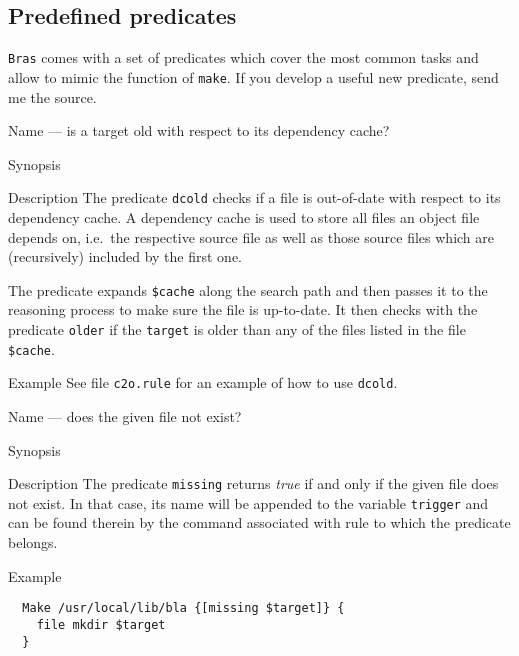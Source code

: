 \documentclass[11pt]{scrartcl}
\newcommand{\Bras}{\texttt{Bras}}
\newcommand{\make}{\texttt{make}}
\begin{document}
\subsection{Predefined predicates}
\label{sec:predicates}

\Bras{} comes with a set of predicates which cover the most common
tasks and allow to mimic the function of \make{}. If you develop a
useful new predicate, send me the source.

\begin{Describe}
\item[Name]  --- is a target old with respect to its
  dependency cache?
\item[Synopsis]  
\item[Description] The predicate \texttt{dcold} checks if a file is
  out-of-date with respect to its dependency cache. A dependency cache
  is used to store all files an object file depends on, i.e.\ the
  respective source file as well as those source files which are
  (recursively) included by the first one.
  
  The predicate expands \texttt{\$cache} along the search path and
  then passes it to the reasoning process to make sure the file is
  up-to-date. It then checks with the predicate \texttt{older} if the
  \texttt{target} is older than any of the files listed in the file
  \texttt{\$cache}.
\item[Example] See file \texttt{c2o.rule} for an example of how to use 
  \texttt{dcold}.
\end{Describe}

\begin{Describe}
\item[Name]  --- does the given file not exist?
\item[Synopsis]  
\item[Description] The predicate \texttt{missing} returns
  \textit{true} if and only if the given file does not exist. In that
  case, its name will be appended to the variable \texttt{trigger} and
  can be found therein by the command associated with rule to which
  the predicate belongs.
\item[Example]
\begin{verbatim}
  Make /usr/local/lib/bla {[missing $target]} { 
    file mkdir $target
  }
\end{verbatim}
\end{Describe}
\end{document}

